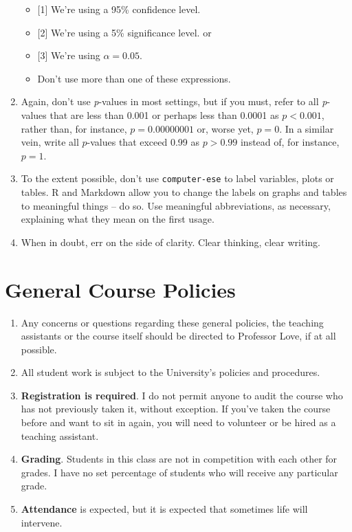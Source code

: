 \documentclass[
]{book}
\providecommand{\tightlist}{%
  \setlength{\itemsep}{0pt}\setlength{\parskip}{0pt}}
\begin{document}
\begin{enumerate}
  \begin{itemize}
  \tightlist
  \item
    {[}1{]} We're using a 95\% confidence level.\\
  \item
    {[}2{]} We're using a 5\% significance level. or
  \item
    {[}3{]} We're using \(\alpha = 0.05\).\\
  \item
    Don't use more than one of these expressions.
  \end{itemize}
\item
  Again, don't use \emph{p}-values in most settings, but if you must, refer to all \emph{p}-values that are less than 0.001 or perhaps less than 0.0001 as \(p < 0.001\), rather than, for instance, \(p = 0.00000001\) or, worse yet, \(p = 0\). In a similar vein, write all \(p\)-values that exceed 0.99 as \(p > 0.99\) instead of, for instance, \(p = 1\).
\item
  To the extent possible, don't use \texttt{computer-ese} to label variables, plots or tables. R and Markdown allow you to change the labels on graphs and tables to meaningful things -- do so. Use meaningful abbreviations, as necessary, explaining what they mean on the first usage.
\item
  When in doubt, err on the side of clarity. Clear thinking, clear writing.
\end{enumerate}

\hypertarget{general-course-policies}{%
\chapter{General Course Policies}\label{general-course-policies}}

\begin{enumerate}
\def\labelenumi{\arabic{enumi}.}
\tightlist
\item
  Any concerns or questions regarding these general policies, the teaching assistants or the course itself should be directed to Professor Love, if at all possible.
\item
  All student work is subject to the University's policies and procedures.
\item
  \textbf{Registration is required}. I do not permit anyone to audit the course who has not previously taken it, without exception. If you've taken the course before and want to sit in again, you will need to volunteer or be hired as a teaching assistant.
\item
  \textbf{Grading}. Students in this class are not in competition with each other for grades. I have no set percentage of students who will receive any particular grade.
\item
  \textbf{Attendance} is expected, but it is expected that sometimes life will intervene.
\end{enumerate}
\end{document}
